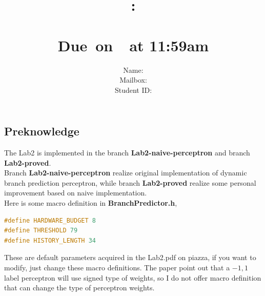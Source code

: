 \documentclass{article}
\title{
    \vspace{2in}
    \textmd{\textbf{\hmwkClass:\\  \hmwkTitle}}\\
    \normalsize\vspace{0.1in}\small{Due\ on\ \hmwkDueDate\ at 11:59am}\\
   \vspace{2in}
}
\author{
	Name: \textbf{\hmwkAuthorName} \\
    Mailbox: \textbf{\hmwkAuthorMail} \\
	Student ID: \hmwkAuthorID}
\date{}
\begin{document}
\maketitle
\pagebreak
\tableofcontents

\pagebreak


\subsection{Preknowledge}
The Lab2 is implemented in the branch \textbf{Lab2-naive-perceptron} and branch \textbf{Lab2-proved}.\\
Branch \textbf{Lab2-naive-perceptron} realize original implementation of dynamic branch prediction perceptron, while branch \textbf{Lab2-proved} realize some personal improvement based on naive implementation.\\
Here is some macro definition in \textbf{BranchPredictor.h},
\begin{lstlisting}[language=c++]
#define HARDWARE_BUDGET 8
#define THRESHOLD 79
#define HISTORY_LENGTH 34
\end{lstlisting}
These are default parameters acquired in the Lab2.pdf on piazza, if you want to modify, just change these macro definitions. The paper point out that a $-1,1$ label perceptron will use signed type of weights, so I do not offer macro definition that can change the type of perceptron weights. 
\end{document}
